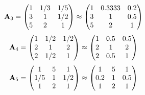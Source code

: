 \documentclass[10pt,a4paper]{article}
\begin{document}
	\[
		\bold{A}_{3} = 
		\begin{pmatrix}
			{1}{} & {1} / {{3}} & {1} / {{5}} \\
			{{3}}{} & {1}{} & {1} / {{2}} \\
			{{5}}{} & {{2}}{} & {1}{} \\
		\end{pmatrix}
		\approx
		\begin{pmatrix}
			1        & 0.3333   & 0.2      \\
			3        & 1        & 0.5      \\
			5        & 2        & 1        \\
		\end{pmatrix}
	\]
	\[
		\bold{A}_{4} = 
		\begin{pmatrix}
			{1}{} & {1} / {{2}} & {1} / {{2}} \\
			{{2}}{} & {1}{} & {{2}}{} \\
			{{2}}{} & {1} / {{2}} & {1}{} \\
		\end{pmatrix}
		\approx
		\begin{pmatrix}
			1        & 0.5      & 0.5      \\
			2        & 1        & 2        \\
			2        & 0.5      & 1        \\
		\end{pmatrix}
	\]
	\[
		\bold{A}_{5} = 
		\begin{pmatrix}
			{1}{} & {{5}}{} & {1}{} \\
			{1} / {{5}} & {1}{} & {1} / {{2}} \\
			{1}{} & {{2}}{} & {1}{} \\
		\end{pmatrix}
		\approx
		\begin{pmatrix}
			1        & 5        & 1        \\
			0.2      & 1        & 0.5      \\
			1        & 2        & 1        \\
		\end{pmatrix}
	\]
\end{document}
